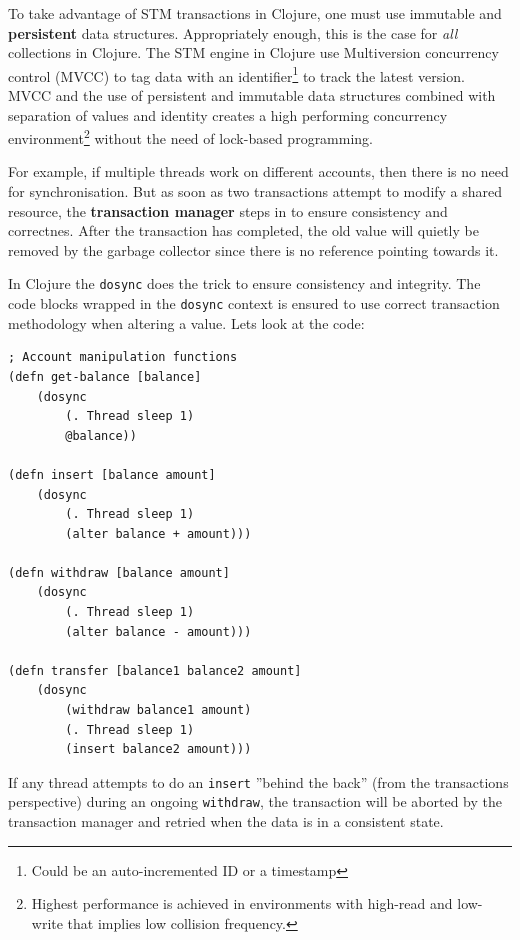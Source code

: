 \documentclass[a4paper,12pt]{kth-mag}
\begin{document}
To take advantage of STM transactions in Clojure, one must use immutable and \textbf{persistent} data structures\cite{sub11}. Appropriately enough, this is the case for \textit{all} collections in Clojure. The STM engine in Clojure use Multiversion concurrency control (MVCC) to tag data with an identifier\footnote{Could be an auto-incremented ID or a timestamp} to track the latest version. MVCC and the use of persistent and immutable data structures combined with separation of values and identity creates a high performing concurrency environment\footnote{Highest performance is achieved in environments with high-read and low-write that implies low collision frequency.} without the need of lock-based programming.

For example, if multiple threads work on different accounts, then there is no need for synchronisation. But as soon as two transactions attempt to modify a shared resource, the \textbf{transaction manager} steps in to ensure consistency and correctnes. After the transaction has completed, the old value will quietly be removed by the garbage collector since there is no reference pointing towards it.

In Clojure the \texttt{dosync} does the trick to ensure consistency and integrity. The code blocks wrapped in the \texttt{dosync} context is ensured to use correct transaction methodology when altering a value. Lets look at the code:
\begin{listing}[H]
    \begin{verbatim}
; Account manipulation functions
(defn get-balance [balance]
    (dosync
        (. Thread sleep 1)
        @balance))

(defn insert [balance amount]
    (dosync
        (. Thread sleep 1)
        (alter balance + amount)))

(defn withdraw [balance amount]
    (dosync
        (. Thread sleep 1)
        (alter balance - amount)))

(defn transfer [balance1 balance2 amount]
    (dosync
        (withdraw balance1 amount)
        (. Thread sleep 1)
        (insert balance2 amount)))
    \end{verbatim}
\end{listing}
If any thread attempts to do an \texttt{insert} ''behind the back'' (from the transactions perspective) during an ongoing \texttt{withdraw}, the transaction will be aborted by the transaction manager and retried when the data is in a consistent state. 
\end{document}
